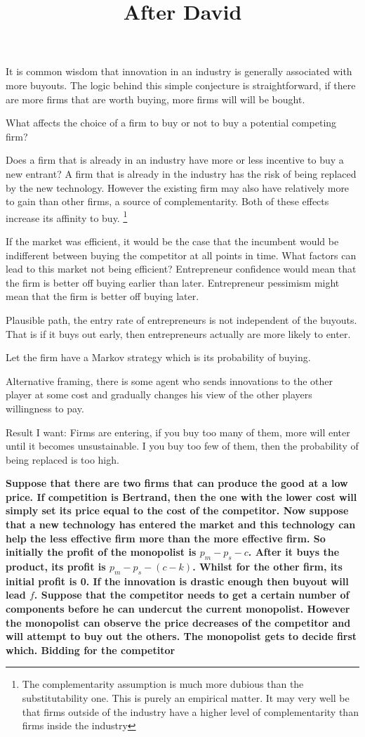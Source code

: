 \documentclass{article}
\title{After David}
\begin{document}
It is common wisdom that innovation in an industry is generally associated with more buyouts. The logic behind this simple conjecture is straightforward, if there are more firms that are worth buying, more firms will will be bought.

What affects the choice of a firm to buy or not to buy a potential competing firm? 

Does a firm that is already in an industry have more or less incentive to buy a new entrant? A firm that is already in the industry has the risk of being replaced by the new technology. However the existing firm may also have relatively more to gain than other firms, a source of complementarity. Both of these effects increase its affinity to buy. \footnote{The complementarity assumption is much more dubious than the substitutability one. This is purely an empirical matter. It may very well be that firms outside of the industry have a higher level of complementarity than firms inside the industry }

If the market was efficient, it would be the case that the incumbent would be indifferent between buying the competitor at all points in time. What factors can lead to this market not being efficient? Entrepreneur confidence would mean that the firm is better off buying earlier than later. Entrepreneur pessimism might mean that the firm is better off buying later. 

Plausible path, the entry rate of entrepreneurs is not independent of the buyouts. That is if it buys out early, then entrepreneurs actually are more likely to enter. 

Let the firm have a Markov strategy which is its probability of buying. 

Alternative framing, there is some agent who sends innovations to the other player at some cost and gradually changes his view of the other players willingness to pay. 

Result I want: Firms are entering, if you buy too many of them, more will enter until it becomes unsustainable. I you buy too few of them, then the probability of being replaced is too high. 


\textbf{
Suppose that there are two firms that can produce the good at a low price. If competition is Bertrand, then the one with the lower cost will simply set its price equal to the cost of the competitor. Now suppose that a new technology has entered the market and this technology can help the less effective firm more than the more effective firm. 
So initially the profit of the monopolist is $p_m-p_s - c$. After it buys the product, its profit is $p_m-p_s - (c-k)$. Whilst for the other firm, its initial profit is 0. If the innovation is drastic enough then buyout will lead $f$. 
Suppose that the competitor needs to get a certain number of components before he can undercut the current monopolist. However the monopolist can observe the price decreases of the competitor and will attempt to buy out the others. The monopolist gets to decide first which. Bidding for the competitor }
\end{document}
